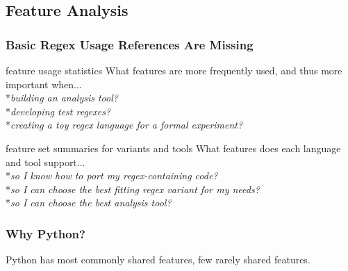 \subsection{Feature Analysis}

\begin{frame}
\frametitle{Basic Regex Usage References Are Missing}
\begin{block}{feature usage statistics}
What features are more frequently used, and thus more important when...
\\*\emph{building an analysis tool?}
\\*\emph{developing test regexes?}
\\*\emph{creating a toy regex language for a formal experiment?}
\end{block}
\begin{block}{feature set summaries for variants and tools}
What features does each language and tool support...
\\*\emph{so I know how to port my regex-containing code?}
\\*\emph{so I can choose the best fitting regex variant for my needs?}
\\*\emph{so I can choose the best analysis tool?}
\end{block}
\end{frame}


\begin{frame}[fragile]
\frametitle{Why Python?}
\begin{footnotesize}Python has most commonly shared features, few rarely shared features.\end{footnotesize}
\begin{columns}[t] %


\end{columns}


\end{frame}


